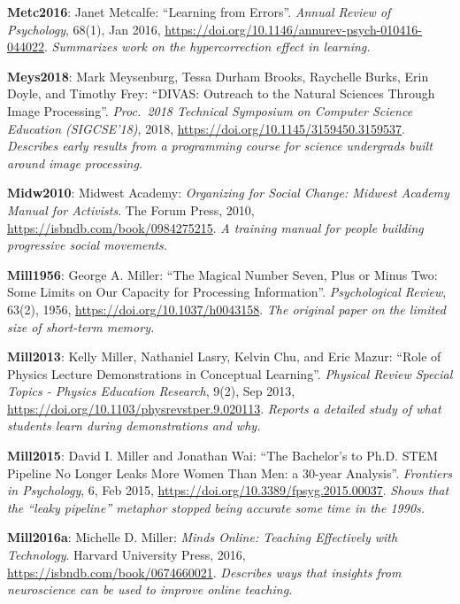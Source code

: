 \textbf{\hypertarget{b:Metc2016}{Metc2016}\label{b:Metc2016}}: Janet Metcalfe: ``Learning from Errors''. \emph{Annual Review of Psychology}, 68(1), Jan 2016, \url{https://doi.org/10.1146/annurev-psych-010416-044022}. \emph{Summarizes work on the hypercorrection effect in learning.}

\textbf{\hypertarget{b:Meys2018}{Meys2018}\label{b:Meys2018}}: Mark Meysenburg, Tessa Durham Brooks, Raychelle Burks, Erin Doyle, and Timothy Frey: ``DIVAS: Outreach to the Natural Sciences Through Image Processing''. \emph{Proc.\ 2018 Technical Symposium on Computer Science Education (SIGCSE'18)}, 2018, \url{https://doi.org/10.1145/3159450.3159537}. \emph{Describes early results from a programming course for science undergrads built around image processing.}

\textbf{\hypertarget{b:Midw2010}{Midw2010}\label{b:Midw2010}}: Midwest Academy: \emph{Organizing for Social Change: Midwest Academy Manual for Activists}. The Forum Press, 2010, \url{https://isbndb.com/book/0984275215}. \emph{A training manual for people building progressive social movements.}

\textbf{\hypertarget{b:Mill1956}{Mill1956}\label{b:Mill1956}}: George A. Miller: ``The Magical Number Seven, Plus or Minus Two: Some Limits on Our Capacity for Processing Information''. \emph{Psychological Review}, 63(2), 1956, \url{https://doi.org/10.1037/h0043158}. \emph{The original paper on the limited size of short-term memory.}

\textbf{\hypertarget{b:Mill2013}{Mill2013}\label{b:Mill2013}}: Kelly Miller, Nathaniel Lasry, Kelvin Chu, and Eric Mazur: ``Role of Physics Lecture Demonstrations in Conceptual Learning''. \emph{Physical Review Special Topics - Physics Education Research}, 9(2), Sep 2013, \url{https://doi.org/10.1103/physrevstper.9.020113}. \emph{Reports a detailed study of what students learn during demonstrations and why.}

\textbf{\hypertarget{b:Mill2015}{Mill2015}\label{b:Mill2015}}: David I. Miller and Jonathan Wai: ``The Bachelor's to Ph.D. STEM Pipeline No Longer Leaks More Women Than Men: a 30-year Analysis''. \emph{Frontiers in Psychology}, 6, Feb 2015, \url{https://doi.org/10.3389/fpsyg.2015.00037}. \emph{Shows that the ``leaky pipeline'' metaphor stopped being accurate some time in the 1990s.}

\textbf{\hypertarget{b:Mill2016a}{Mill2016a}\label{b:Mill2016a}}: Michelle D. Miller: \emph{Minds Online: Teaching Effectively with Technology}. Harvard University Press, 2016, \url{https://isbndb.com/book/0674660021}. \emph{Describes ways that insights from neuroscience can be used to improve online teaching.}

